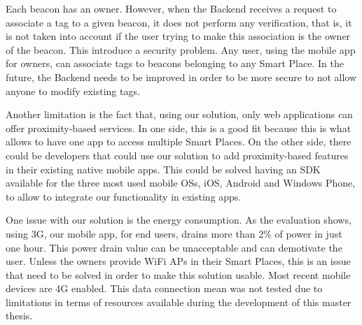 Each beacon has an owner.
However, when the Backend receives a request to associate a tag to a given beacon, it does not perform any verification, that is, it is not taken into account if the user trying to make this association is the owner of the beacon.
This introduce a security problem. Any user, using the mobile app for owners, can associate tags to beacons belonging to any Smart Place.
In the future, the Backend needs to be improved in order to be more secure to not allow anyone to modify existing tags.

Another limitation is the fact that, using our solution, only web applications can offer proximity-based services.
In one side, this is a good fit because this is what allows to have one app to access multiple Smart Places.
On the other side, there could be developers that could use our solution to add proximity-based features in their existing native mobile apps.
This could be solved having an \gls{SDK} available for the three most used mobile \glspl{OS}, iOS, Android and Windows Phone, to allow to integrate our functionality in existing apps.

One issue with our solution is the energy consumption.
As the evaluation shows, using \gls{3G}, our mobile app, for end users, drains more than 2\% of power in just one hour. This power drain value can be unacceptable and can demotivate the user.
Unless the owners provide \gls{WiFi} \glspl{AP} in their Smart Places, this is an issue that need to be solved in order to make this solution usable.
Most recent mobile devices are \gls{4G} enabled.
This data connection mean was not tested due to limitations in terms of resources available during the development of this master thesis.

